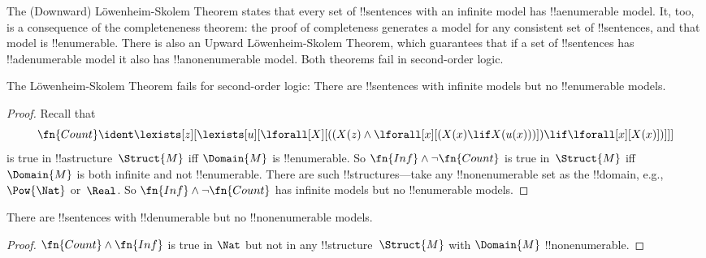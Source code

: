 \documentclass[../../../include/open-logic-section]{subfiles}
\begin{document}


\begin{explain}
The (Downward) L\"owenheim-Skolem Theorem states that every set of
!!{sentence}s with an infinite model has !!a{enumerable} model.  It,
too, is a consequence of the completeneness theorem: the proof of
completeness generates a model for any consistent set of
!!{sentence}s, and that model is !!{enumerable}.  There is also an
Upward L\"owenheim-Skolem Theorem, which guarantees that if a set of
!!{sentence}s has !!a{denumerable} model it also has
!!a{nonenumerable} model.  Both theorems fail in second-order logic.
\end{explain}


\begin{thm}
 The L\"owenheim-Skolem Theorem fails for
second-order logic: There are !!{sentence}s with infinite models but
no !!{enumerable} models.
\end{thm}

\begin{proof}
Recall that 
\[
\fn{Count} \ident \lexists[z][\lexists[u][\lforall[X][((X(z) \land
      \lforall[x][(X(x) \lif X(u(x)))]) \lif \lforall[x][X(x)])]]]
\]
is true in !!a{structure}~$\Struct{M}$ iff $\Domain{M}$ is
!!{enumerable}. So $\fn{Inf} \land \lnot\fn{Count}$ is true in~$\Struct{M}$
iff $\Domain{M}$ is both infinite and not !!{enumerable}.  There are
such !!{structure}s---take any !!{nonenumerable} set as the
!!{domain}, e.g., $\Pow{\Nat}$ or~$\Real$. So $\fn{Inf} \land
\lnot \fn{Count}$ has infinite models but no !!{enumerable} models.
\end{proof}

\begin{thm}
There are !!{sentence}s with !!{denumerable} but no
!!{nonenumerable} models.
\end{thm}

\begin{proof}
$\fn{Count} \land \fn{Inf}$ is true in $\Nat$ but not in any
  !!{structure}~$\Struct{M}$ with $\Domain{M}$ !!{nonenumerable}.
\end{proof}
\end{document}
